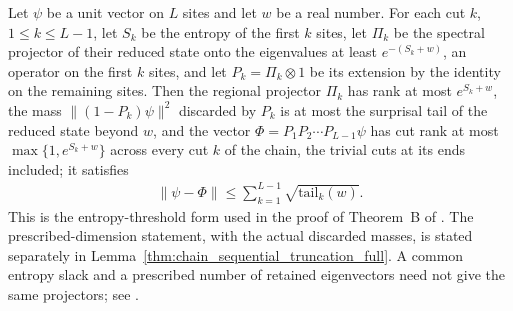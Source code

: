 \begin{lemma}
    \label{lem:chain_sequential_truncation}
    \leanok
    Let $\psi$ be a unit vector on $L$ sites and let $w$ be a real number. For
    each cut $k$,
    $1\le k\le L-1$, let $S_k$ be the entropy of the first $k$ sites, let
    $\Pi_k$ be the spectral projector of their reduced state onto the
    eigenvalues at least $e^{-(S_k+w)}$, an operator on the first $k$ sites,
    and let $P_k=\Pi_k\otimes1$ be its extension by the identity on the
    remaining sites. Then the regional projector $\Pi_k$ has rank at most
    $e^{S_k+w}$, the mass $\|(1-P_k)\psi\|^2$ discarded by $P_k$ is at most
    the surprisal tail of the reduced state beyond $w$, and the vector
    $\Phi=P_1P_2\cdots P_{L-1}\psi$ has cut rank at most
    $\max\{1,e^{S_k+w}\}$ across every cut $k$ of the chain, the trivial
    cuts at its ends included; it satisfies
    \begin{align}
        \|\psi-\Phi\|\le\sum_{k=1}^{L-1}\sqrt{\text{tail}_k(w)} .
    \end{align}
    This is the entropy-threshold form used in the proof of Theorem~B
    of \cite{TNLean2026OneDimensional}. The prescribed-dimension statement,
    with the actual discarded masses, is stated separately in
    Lemma~\ref{thm:chain_sequential_truncation_full}.
    A common entropy slack and a prescribed number of retained eigenvectors
    need not give the same projectors; see
    \cite{gap:tnlean_one_dimensional_threshold_truncation}.
\end{lemma}

